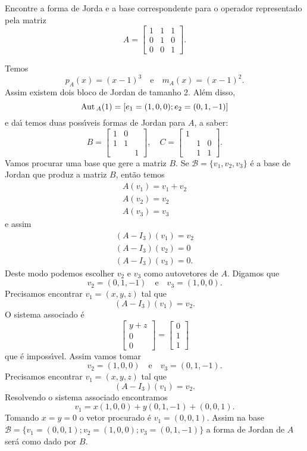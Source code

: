 \begin{enumerate}[label={\arabic*})]
	Encontre a forma de Jorda e a base correspondente para o operador representado pela matriz
	\[
		A = \begin{bmatrix}
			1 & 1 & 1\\
			0 & 1 & 0\\
			0 & 0 & 1
		\end{bmatrix}.
	\]
	\begin{solucao}
		Temos
		\[
			p_A(x) = (x - 1)^3 \quad \mbox{e}\quad m_A(x) = (x - 1)^2.
		\]
		Assim existem dois bloco de Jordan de tamanho 2. Al\'em disso,
		\[
			{\rm Aut\,}_A(1) = [e_1 = (1,0,0); e_2 = (0,1,-1)]
		\]
		e da{\'\i} temos duas poss{\'\i}veis formas de Jordan para $A$, a saber:
		\[
			B = \begin{bmatrix}
				1 & 0 &\\
				1 & 1 &\\
				& & 1
			\end{bmatrix},\quad
			C = \begin{bmatrix}
				 1 &  &\\
				 & 1 & 0\\
				 & 1 & 1
			\end{bmatrix}.
		\]
		Vamos procurar uma base que gere a matriz $B$. Se $\mathcal{B} = \{v_1, v_2, v_3\}$ \'e a base de Jordan que produz a matriz $B$, ent\~ao temos
		\begin{align*}
			A(v_1) = v_1 + v_2\\
			A(v_2) = v_2\\
			A(v_3) = v_3
		\end{align*}
		e assim
		\begin{align*}
			(A - I_3)(v_1) = v_2\\
			(A - I_3)(v_2) = 0\\
			(A - I_3)(v_3) = 0.
		\end{align*}
		Deste modo podemos escolher $v_2$ e $v_3$ como autovetores de $A$. Digamos que
		\[
			v_2 = (0,1,-1) \quad \mbox{e} \quad v_3 = (1,0,0).
		\]
		Precisamos encontrar $v_1 = (x,y,z)$ tal que
		\[
			(A - I_3)(v_1) = v_2.
		\]
		O sistema associado \'e
		\[
			\begin{bmatrix}
				y + z\\
				0\\
				0
			\end{bmatrix} = \begin{bmatrix}
				0\\
				1\\
				1
			\end{bmatrix}
		\]
		que \'e imposs{\'\i}vel. Assim vamos tomar
		\[
			v_2 = (1,0,0) \quad \mbox{e} \quad v_3 = (0,1,-1).
		\]
		Precisamos encontrar $v_1 = (x,y,z)$ tal que
		\[
			(A - I_3)(v_1) = v_2.
		\]
		Resolvendo o sistema associado encontramos
		\[
				v_1 = x(1,0,0) + y(0,1,-1) + (0,0,1).
		\]
		Tomando $x = y = 0$ o vetor procurado \'e $v_1 = (0,0,1)$. Assim na base $\mathcal{B} = \{v_1 = (0,0,1); v_2 = (1,0,0); v_3 = (0,1,-1)\}$ a forma de Jordan de $A$ ser\'a como dado por $B$.


\end{solucao}
\end{enumerate}
